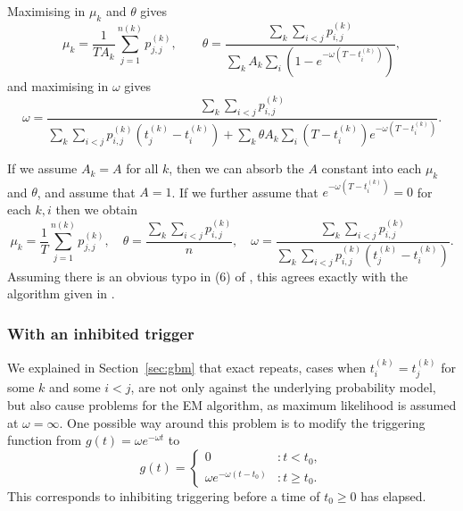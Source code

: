 \documentclass[twoside,a4paper]{article}
\theoremstyle{plain}
\theoremstyle{definition}
\begin{document}
Maximising in $\mu_k$ and $\theta$ gives
\[ \mu_k = \frac{1}{T A_k} \sum_{j=1}^{n(k)} p^{(k)}_{j,j},
\qquad
\theta = \frac{\sum_k \sum_{i<j} p^{(k)}_{i,j}}{\sum_k A_k \sum_i (1-e^{-\omega(T-t^{(k)}_i)})},
\]
and maximising in $\omega$ gives
\[ \omega = \frac{\sum_k \sum_{i<j} p^{(k)}_{i,j}}{
\sum_k \sum_{i<j} p^{(k)}_{i,j} (t^{(k)}_j - t^{(k)}_i)
+ \sum_k \theta A_k \sum_i (T-t^{(k)}_i) e^{-\omega(T-t^{(k)}_i)}
}. \]

If we assume $A_k=A$ for all $k$, then we can absorb the $A$ constant into each $\mu_k$
and $\theta$, and assume that $A=1$.  If we further assume that $e^{-\omega(T-t^{(k)}_i)}=0$
for each $k,i$ then we obtain
\[ \mu_k = \frac{1}{T} \sum_{j=1}^{n(k)} p^{(k)}_{j,j},
\quad
\theta = \frac{\sum_k \sum_{i<j} p^{(k)}_{i,j}}{n},
\quad
\omega = \frac{\sum_k \sum_{i<j} p^{(k)}_{i,j}}{
\sum_k \sum_{i<j} p^{(k)}_{i,j} (t^{(k)}_j - t^{(k)}_i)}. \]
Assuming there is an obvious typo in (6) of \cite{sepp2},
this agrees exactly with the algorithm given in \cite[Section~2.2]{sepp2}.


\subsubsection{With an inhibited trigger}\label{app:grid_model_em_inhib}

We explained in Section~\ref{sec:gbm} that exact repeats, cases when $t^{(k)}_i = t^{(k)}_j$
for some $k$ and some $i < j$, are not only against the underlying probability model, but
also cause problems for the EM algorithm, as maximum likelihood is assumed at $\omega=\infty$.
One possible way around this problem is to modify the triggering function from $g(t) = \omega
e^{-\omega t}$ to
\[ g(t) = \begin{cases} 0 &: t<t_0, \\ \omega e^{-\omega(t-t_0)} &: t\geq t_0.
\end{cases} \]
This corresponds to inhibiting triggering before a time of $t_0 \geq 0$ has elapsed.
\end{document}

